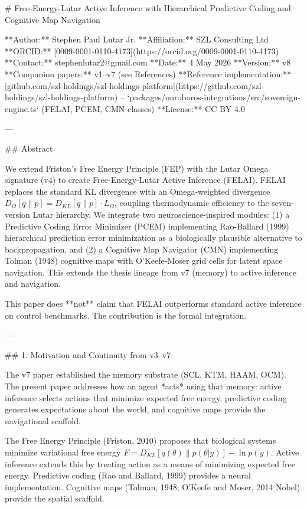 # Free-Energy-Lutar Active Inference with Hierarchical Predictive Coding and Cognitive Map Navigation

**Author:** Stephen Paul Lutar Jr.
**Affiliation:** SZL Consulting Ltd
**ORCID:** [0009-0001-0110-4173](https://orcid.org/0009-0001-0110-4173)
**Contact:** stephenlutar2@gmail.com
**Date:** 4 May 2026
**Version:** v8
**Companion papers:** v1--v7 (see References)
**Reference implementation:** [github.com/szl-holdings/szl-holdings-platform](https://github.com/szl-holdings/szl-holdings-platform) -- `packages/ouroboros-integrations/src/sovereign-engine.ts` (FELAI, PCEM, CMN classes)
**License:** CC BY 4.0

---

## Abstract

We extend Friston's Free Energy Principle (FEP) with the Lutar Omega signature (v4) to create Free-Energy-Lutar Active Inference (FELAI). FELAI replaces the standard KL divergence with an Omega-weighted divergence \( D_\Omega[q \| p] = D_{KL}[q \| p] \cdot L_\Omega \), coupling thermodynamic efficiency to the seven-version Lutar hierarchy. We integrate two neuroscience-inspired modules: (1) a Predictive Coding Error Minimizer (PCEM) implementing Rao-Ballard (1999) hierarchical prediction error minimization as a biologically plausible alternative to backpropagation, and (2) a Cognitive Map Navigator (CMN) implementing Tolman (1948) cognitive maps with O'Keefe-Moser grid cells for latent space navigation. This extends the thesis lineage from v7 (memory) to active inference and navigation.

This paper does **not** claim that FELAI outperforms standard active inference on control benchmarks. The contribution is the formal integration.

---

## 1. Motivation and Continuity from v3--v7

The v7 paper established the memory substrate (SCL, KTM, HAAM, OCM). The present paper addresses how an agent *acts* using that memory: active inference selects actions that minimize expected free energy, predictive coding generates expectations about the world, and cognitive maps provide the navigational scaffold.

The Free Energy Principle (Friston, 2010) proposes that biological systems minimize variational free energy \( F = D_{KL}[q(\theta) \| p(\theta | y)] - \ln p(y) \). Active inference extends this by treating action as a means of minimizing expected free energy. Predictive coding (Rao and Ballard, 1999) provides a neural implementation. Cognitive maps (Tolman, 1948; O'Keefe and Moser, 2014 Nobel) provide the spatial scaffold.


